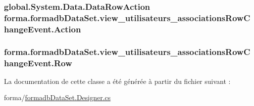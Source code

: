 \subsubsection[{\texorpdfstring{Action}{Action}}]{\setlength{\rightskip}{0pt plus 5cm}global.\+System.\+Data.\+Data\+Row\+Action forma.\+formadb\+Data\+Set.\+view\+\_\+utilisateurs\+\_\+associations\+Row\+Change\+Event.\+Action\hspace{0.3cm}{\ttfamily [get]}}\hypertarget{classforma_1_1formadb_data_set_1_1view__utilisateurs__associations_row_change_event_a4fd74fb4eb28f0d5a5405dc2a40ab070}{}\label{classforma_1_1formadb_data_set_1_1view__utilisateurs__associations_row_change_event_a4fd74fb4eb28f0d5a5405dc2a40ab070}
\subsubsection[{\texorpdfstring{Row}{Row}}]{ forma.\+formadb\+Data\+Set.\+view\+\_\+utilisateurs\+\_\+associations\+Row\+Change\+Event.\+Row\hspace{0.3cm}{\ttfamily [get]}}\hypertarget{classforma_1_1formadb_data_set_1_1view__utilisateurs__associations_row_change_event_a1b728b51acc5f32e80cf9791201bd09c}{}\label{classforma_1_1formadb_data_set_1_1view__utilisateurs__associations_row_change_event_a1b728b51acc5f32e80cf9791201bd09c}


La documentation de cette classe a été générée à partir du fichier suivant \+:\begin{DoxyCompactItemize}
\item 
forma/\hyperlink{formadb_data_set_8_designer_8cs}{formadb\+Data\+Set.\+Designer.\+cs}\end{DoxyCompactItemize}
